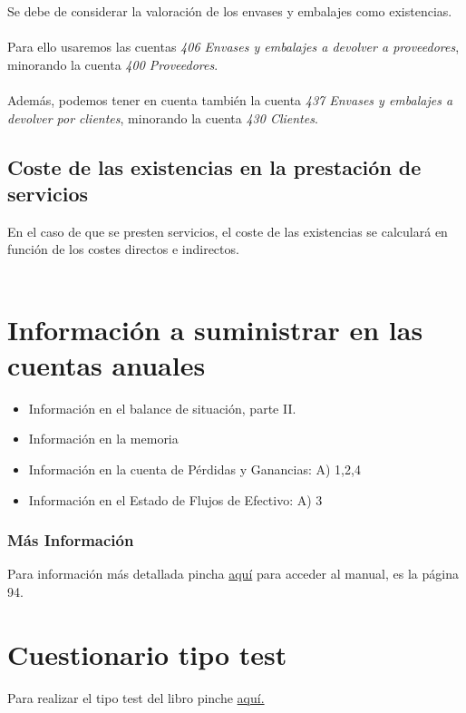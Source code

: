 \documentclass[a4paper,12pt]{article}
\begin{document}
Se debe de considerar la valoración de los envases y embalajes como existencias.\\\\
Para ello usaremos las cuentas \textit{406 Envases y embalajes a devolver a proveedores}, minorando la cuenta  \textit{400 Proveedores}.\\\\
Además, podemos tener en cuenta también la cuenta \textit{437 Envases y embalajes a devolver por clientes}, minorando la cuenta \textit{430 Clientes}.


\subsection{Coste de las existencias en la prestación de servicios}

En el caso de que se presten servicios, el coste de las existencias se calculará en función de los costes directos e indirectos.\\\\

\section{Información a suministrar en las cuentas anuales}

\begin{itemize}
    \item Información en el balance de situación, parte II.
    \item Información en la memoria
    \item Información en la cuenta de Pérdidas y Ganancias: A) 1,2,4
    \item Información en el Estado de Flujos de Efectivo: A) 3
\end{itemize}

\subsubsection*{Más Información}
Para información más detallada pincha \href{https://elblogdeismael.github.io/Asignaturas/Tercer%20A%C3%B1o/CF1/Teoria/FCCEE/build/Teoria.pdf}{aquí} para acceder al manual, es la página 94.

\newpage
\section{Cuestionario tipo test}
Para realizar el tipo test del libro pinche \href{https://elblogdeismael.github.io/Asignaturas/Tercer%20A%C3%B1o/CF1/Tests/testT2Libro.html}{aquí.}
\end{document}
